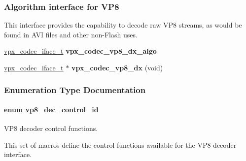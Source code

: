 \subsubsection*{\-Algorithm interface for \-V\-P8}
\label{_amgrp0b829b38ff2e659173b35cd78e0735bd}%
 \-This interface provides the capability to decode raw \-V\-P8 streams, as would be found in \-A\-V\-I files and other non-\/\-Flash uses. \begin{DoxyCompactItemize}
\item 
\hypertarget{group__vp8__decoder_ga1e151f9094620511e7aa49c04bf8b79e}{
\hyperlink{group__codec_gad654f3da60151f5dfef70aca00ef1e9e}{vpx\-\_\-codec\-\_\-iface\-\_\-t} {\bfseries vpx\-\_\-codec\-\_\-vp8\-\_\-dx\-\_\-algo}}
\label{group__vp8__decoder_ga1e151f9094620511e7aa49c04bf8b79e}

\item 
\hypertarget{group__vp8__decoder_ga105d15fdb6baef8a2f02d6d5283847fb}{
\hyperlink{group__codec_gad654f3da60151f5dfef70aca00ef1e9e}{vpx\-\_\-codec\-\_\-iface\-\_\-t} $\ast$ {\bfseries vpx\-\_\-codec\-\_\-vp8\-\_\-dx} (void)}
\label{group__vp8__decoder_ga105d15fdb6baef8a2f02d6d5283847fb}

\end{DoxyCompactItemize}


\subsubsection{\-Enumeration \-Type \-Documentation}
\hypertarget{group__vp8__decoder_gaf9dd3f2e6d1412106ee791af768e57c1}{
\paragraph[{vp8\-\_\-dec\-\_\-control\-\_\-id}]{\setlength{\rightskip}{0pt plus 5cm}enum {\bf vp8\-\_\-dec\-\_\-control\-\_\-id}}}
\label{group__vp8__decoder_gaf9dd3f2e6d1412106ee791af768e57c1}


\-V\-P8 decoder control functions. 

\-This set of macros define the control functions available for the \-V\-P8 decoder interface.

